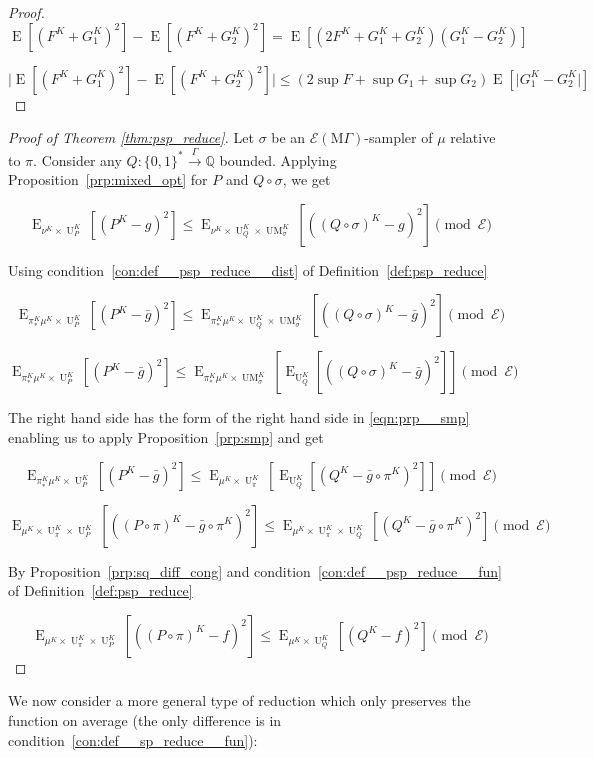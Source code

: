 \documentclass{article}
\numberwithin{equation}{section}
\theoremstyle{definition}
\theoremstyle{plain}
\newcommand{\Bool}{\{0,1\}}
\newcommand{\Words}{{\Bool^*}}
\DeclareMathOperator{\E}{E}
\DeclareMathOperator{\UM}{UM}
\DeclareMathOperator{\Un}{U}
\newcommand{\Rats}{\mathbb{Q}}
\newcommand{\Abs}[1]{\lvert #1 \rvert}
\newcommand{\MGrow}{\mathrm{M}\Gamma}
\newcommand{\Fall}{\mathcal{E}}
\newcommand{\EMG}{\Fall(\MGrow)}
\newcommand{\Scheme}{\xrightarrow{\Gamma}}
\begin{document}
\begin{proof}

\[\E[(F^K + G_1^K)^2] - \E[(F^K + G_2^K)^2] = \E[(2 F^K + G_1^K + G_2^K)(G_1^K - G_2^K)]\]

\[\Abs{\E[(F^K + G_1^K)^2] - \E[(F^K + G_2^K)^2]} \leq (2 \sup F + \sup G_1 + \sup G_2) \E[\Abs{G_1^K - G_2^K}]\]
%
\end{proof}

\begin{proof}[Proof of Theorem \ref{thm:psp_reduce}]

Let ${\sigma}$ be an ${\EMG}$-sampler of ${\mu}$ relative to ${\pi}$. Consider any ${Q: \Words \Scheme \Rats}$ bounded. Applying Proposition~\ref{prp:mixed_opt} for ${P}$ and ${Q \circ \sigma}$, we get

\[\E_{\nu^{K} \times \Un_P^K}[(P^K-g)^2] \leq \E_{\nu^{K} \times \Un_Q^K \times \UM_\sigma^K}[((Q \circ \sigma)^K - g)^2] \pmod \Fall\]

Using condition~\ref{con:def__psp_reduce__dist} of Definition~\ref{def:psp_reduce}

\[\E_{\pi_*^K\mu^{K} \times \Un_P^K}[(P^K-\bar{g})^2] \leq \E_{\pi_*^K\mu^{K} \times \Un_Q^K \times \UM_\sigma^K}[((Q \circ \sigma)^K - \bar{g})^2] \pmod \Fall\]

\[\E_{\pi_*^K\mu^{K} \times \Un_P^K}[(P^K-\bar{g})^2] \leq \E_{\pi_*^K\mu^{K} \times \UM_\sigma^K}[\E_{\Un_Q^K}[((Q \circ \sigma)^K - \bar{g})^2]] \pmod \Fall\]

The right hand side has the form of the right hand side in \ref{eqn:prp__smp} enabling us to apply Proposition~\ref{prp:smp} and get

\[\E_{\pi_*^K\mu^{K} \times \Un_P^K}[(P^K-\bar{g})^2] \leq \E_{\mu^{K} \times \Un_\pi^K}[\E_{\Un_Q^K}[(Q^K - \bar{g} \circ \pi^K)^2]] \pmod \Fall\]

\[\E_{\mu^{K} \times \Un_\pi^K \times \Un_P^K}[((P \circ \pi)^K-\bar{g} \circ \pi^K)^2] \leq \E_{\mu^{K} \times \Un_\pi^K \times \Un_Q^K}[(Q^K - \bar{g} \circ \pi^K)^2] \pmod \Fall\]

By Proposition~\ref{prp:sq_diff_cong} and condition~\ref{con:def__psp_reduce__fun} of Definition~\ref{def:psp_reduce}

\[\E_{\mu^{K} \times \Un_\pi^K \times \Un_P^K}[((P \circ \pi)^K-f)^2] \leq \E_{\mu^{K} \times \Un_Q^K}[(Q^K - f)^2] \pmod \Fall\]
%
\end{proof}

We now consider a more general type of reduction which only preserves the function on average (the only difference is in condition~\ref{con:def__sp_reduce__fun}):
\end{document}
